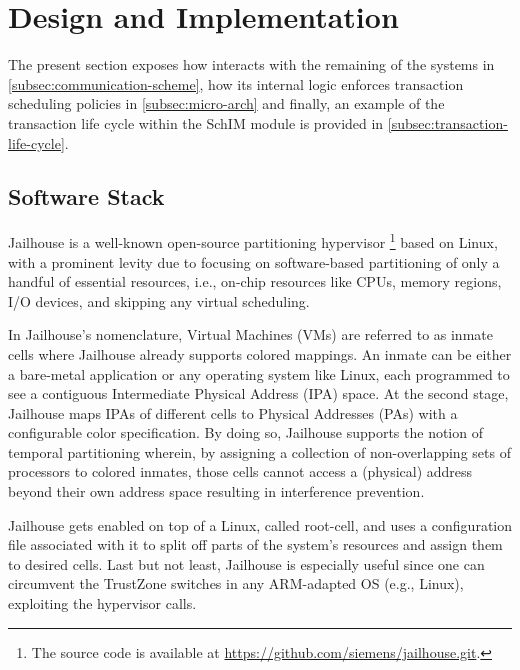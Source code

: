 \section{\schim Design and Implementation}
\label{sec:schim_implmentation}

The present section exposes how \schim interacts with the remaining of
the systems in \ref{subsec:communication-scheme}, how its internal
logic enforces transaction scheduling policies in
\ref{subsec:micro-arch} and finally, an example of the transaction
life cycle within the SchIM module is provided in
\ref{subsec:transaction-life-cycle}.

\subsection{Software Stack}
Jailhouse is a well-known open-source partitioning
hypervisor \footnote{The source code is available at
  \url{https://github.com/siemens/jailhouse.git}.} based on Linux,
with a prominent levity due to focusing on software-based partitioning
of only a handful of essential resources, i.e., on-chip resources like
CPUs, memory regions, I/O devices, and skipping any virtual
scheduling.

In Jailhouse's nomenclature, Virtual Machines (VMs) are referred to as
inmate cells where Jailhouse already supports colored mappings. An
inmate can be either a bare-metal application or any operating system
like Linux, each programmed to see a contiguous Intermediate Physical
Address (IPA) space. At the second stage, Jailhouse maps IPAs of
different cells to Physical Addresses (PAs) with a configurable color
specification. By doing so, Jailhouse supports the notion of temporal
partitioning wherein, by assigning a collection of non-overlapping
sets of processors to colored inmates, those cells cannot access a
(physical) address beyond their own address space resulting in
interference prevention.

Jailhouse gets enabled on top of a Linux, called root-cell, and uses a
configuration file associated with it to split off parts of the
system's resources and assign them to desired cells. Last but not
least, Jailhouse is especially useful since one can circumvent the
TrustZone switches in any ARM-adapted OS (e.g., Linux), exploiting the
hypervisor calls.


